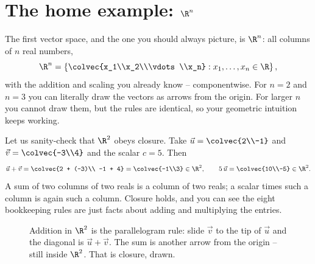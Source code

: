 \section{The home example: $\R^n$}

The first vector space, and the one you should always picture, is $\R^n$: all columns of
$n$ real numbers,
\[
\R^n = \left\{ \colvec{x_1\\x_2\\\vdots\\x_n} : x_1,\dots,x_n \in \R \right\},
\]
with the addition and scaling you already know -- componentwise. For $n=2$ and $n=3$ you
can literally draw the vectors as arrows from the origin. For larger $n$ you cannot draw
them, but the rules are identical, so your geometric intuition keeps working.

\begin{example}\label{ch11:r2-check}
Let us sanity-check that $\R^2$ obeys closure. Take
$\vec{u} = \colvec{2\\-1}$ and $\vec{v} = \colvec{-3\\4}$ and the scalar $c = 5$. Then
\[
\vec{u} + \vec{v} = \colvec{2 + (-3)\\ -1 + 4} = \colvec{-1\\3} \in \R^2,
\qquad
5\,\vec{u} = \colvec{10\\-5} \in \R^2.
\]
A sum of two columns of two reals is a column of two reals; a scalar times such a column
is again such a column. Closure holds, and you can see the eight bookkeeping rules are
just facts about adding and multiplying the entries.
\end{example}

\begin{figure}[H]
\centering
{}
\caption{Addition in $\R^2$ is the parallelogram rule: slide $\vec{v}$ to the tip of
$\vec{u}$ and the diagonal is $\vec{u}+\vec{v}$. The sum is another arrow from the origin
-- still inside $\R^2$. That is closure, drawn.}
\label{ch11:fig-r2add}
\end{figure}

